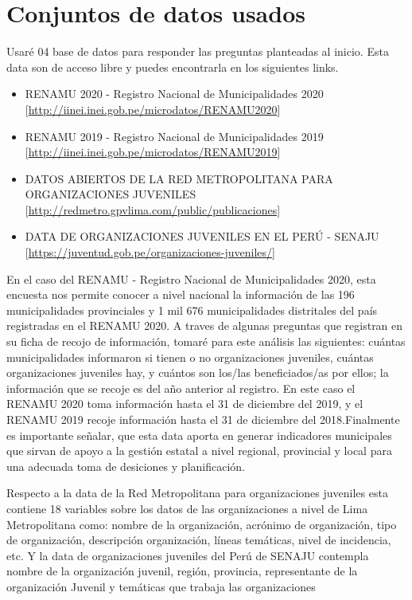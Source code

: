 \documentclass[
]{book}
\providecommand{\tightlist}{%
  \setlength{\itemsep}{0pt}\setlength{\parskip}{0pt}}
\begin{document}
\hypertarget{conjuntos-de-datos-usados-3}{%
\section{Conjuntos de datos usados}\label{conjuntos-de-datos-usados-3}}

Usaré 04 base de datos para responder las preguntas planteadas al inicio. Esta data son de acceso libre y puedes encontrarla en los siguientes links.

\begin{itemize}
\tightlist
\item
  RENAMU 2020 - Registro Nacional de Municipalidades 2020 {[}\url{http://iinei.inei.gob.pe/microdatos/RENAMU2020}{]}
\item
  RENAMU 2019 - Registro Nacional de Municipalidades 2019 {[}\url{http://iinei.inei.gob.pe/microdatos/RENAMU2019}{]}
\item
  DATOS ABIERTOS DE LA RED METROPOLITANA PARA ORGANIZACIONES JUVENILES {[}\url{http://redmetro.gpvlima.com/public/publicaciones}{]}
\item
  DATA DE ORGANIZACIONES JUVENILES EN EL PERÚ - SENAJU {[}\url{https://juventud.gob.pe/organizaciones-juveniles/}{]}
\end{itemize}

En el caso del RENAMU - Registro Nacional de Municipalidades 2020, esta encuesta nos permite conocer a nivel nacional la información de las 196 municipalidades provinciales y 1 mil 676 municipalidades distritales del
país registradas en el RENAMU 2020. A traves de algunas preguntas que registran en su ficha de recojo de información, tomaré para este análisis las siguientes: cuántas municipalidades informaron si tienen o no organizaciones juveniles, cuántas organizaciones juveniles hay, y cuántos son los/las beneficiados/as por ellos; la información que se recoje es del año anterior al registro. En este caso el RENAMU 2020 toma información hasta el 31 de diciembre del 2019, y el RENAMU 2019 recoje información hasta el 31 de diciembre del 2018.Finalmente es importante señalar, que esta data aporta en generar indicadores municipales que sirvan de apoyo a la gestión estatal a nivel regional, provincial y local para una adecuada toma de desiciones y planificación.

Respecto a la data de la Red Metropolitana para organizaciones juveniles esta contiene 18 variables sobre los datos de las organizaciones a nivel de Lima Metropolitana como: nombre de la organización, acrónimo de organización, tipo de organización, descripción organización, líneas temáticas, nivel de incidencia, etc. Y la data de organizaciones juveniles del Perú de SENAJU contempla nombre de la organización juvenil, región, provincia, representante de la organización Juvenil y temáticas que trabaja las organizaciones
\end{document}
